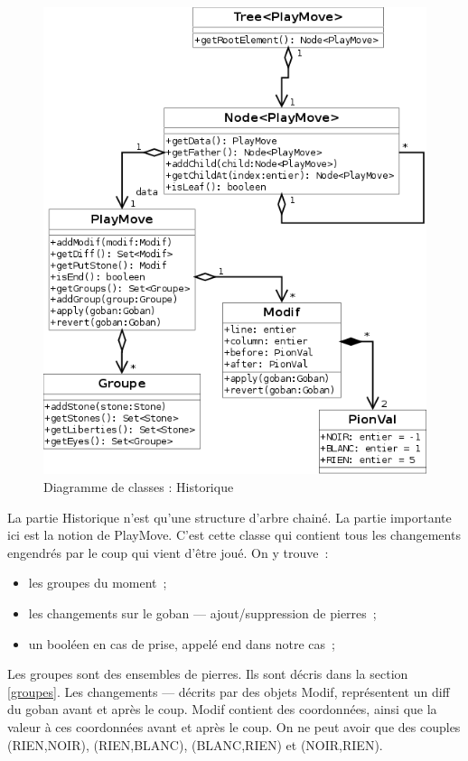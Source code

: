 \documentclass[11pt,a4paper,titlepage,french]{article}
\begin{document}
					\begin{figure}[hbt]
						\begin{center}
							\includegraphics[width=\textwidth]{./history.png}
						\end{center}
						\caption{Diagramme de classes : Historique}
						\label{history}
					\end{figure}

				La partie Historique n'est qu'une structure d'arbre chainé. La partie importante ici est la notion de PlayMove. C'est cette classe qui contient tous les changements engendrés par le coup qui vient d'être joué. On y trouve~:
				\begin{itemize}
					\item les groupes du moment~;
					\item les changements sur le goban --- ajout/suppression de pierres~;
					\item un booléen en cas de prise, appelé end dans notre cas~;
				\end{itemize}

				Les groupes sont des ensembles de pierres. Ils sont décris dans la section \ref{groupes}. Les changements --- décrits par des objets Modif, représentent un diff du goban avant et après le coup. Modif contient des coordonnées, ainsi que la valeur à ces coordonnées avant et après le coup. On ne peut avoir que des couples (RIEN,NOIR), (RIEN,BLANC), (BLANC,RIEN) et (NOIR,RIEN).
\end{document}

